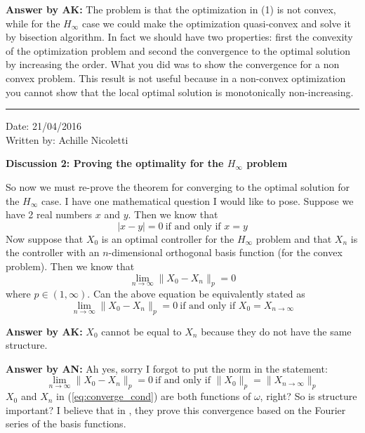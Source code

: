 \documentclass[12pt]{article}
\begin{document}
{\bf Answer by AK:} The problem is that the optimization in (1) is not convex, while for the $H_\infty$ case we could make the optimization quasi-convex and solve it by bisection algorithm. In fact we should have two properties: first the convexity of the optimization problem and second the convergence to the optimal solution by increasing the order. What you did was to show the convergence for a non convex problem. This result is not useful because in a non-convex optimization you cannot show that the local optimal solution is monotonically non-increasing.

\hrule
\begin{flushright}
Date: 21/04/2016 \\
Written by: Achille Nicoletti
\end{flushright}
\textbf{Discussion 2: Proving the optimality for the $H_\infty$ problem}

So now we must re-prove the theorem for converging to the optimal solution for the $H_\infty$ case. I have one mathematical question I would like to pose. Suppose we have 2 real numbers $x$ and $y$. Then we know that
\begin{equation}
|x - y| =0 \ \mbox{if and only if } x = y
\end{equation}
Now suppose that $X_0$ is an optimal controller for the $H_\infty$ problem and that $X_n$ is the controller with an $n$-dimensional orthogonal basis function (for the convex problem). Then we know that
\begin{equation} \label{eq:converge_cond}
\lim_{n \to \infty} \|X_0 - X_n \|_p =0
\end{equation}
where $p \in (1,\infty)$. Can the above equation be equivalently stated as
\begin{equation}
\lim_{n \to \infty} \|X_0 - X_n \|_p =0 \ \mbox{if and only if } X_0 = X_{n \to \infty}  
\end{equation}

{\bf Answer by AK:} $X_0$ cannot be equal to $X_n$ because they do not have the same structure.

{\bf Answer by AN:} Ah yes, sorry I forgot to put the norm in the statement:
\begin{equation}
\lim_{n \to \infty} \|X_0 - X_n \|_p =0 \ \mbox{if and only if } \|X_0\|_p = \|X_{n \to \infty}\|_p  
\end{equation}
$X_0$ and $X_n$ in (\ref{eq:converge_cond}) are both functions of $\omega$, right? So is structure important? I believe that in \cite{AN99b}, they prove this convergence based on the  Fourier series of the basis functions.
\end{document}
